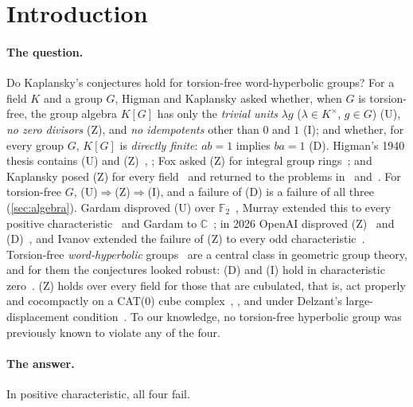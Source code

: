 \documentclass[11pt]{article}
\theoremstyle{definition}
\theoremstyle{plain}
\newcommand{\F}{\mathbb{F}}
\newcommand{\C}{\mathbb{C}}
\begin{document}
\section{Introduction}\label{sec:intro}

\paragraph{The question.} Do Kaplansky's conjectures hold for torsion-free word-hyperbolic groups? For a field $K$ and a group $G$, Higman and Kaplansky asked whether, when $G$ is torsion-free, the group algebra $K[G]$ has only the \emph{trivial units} $\lambda g$ ($\lambda\in K^\times$, $g\in G$) \textup{(U)}, \emph{no zero divisors} \textup{(Z)}, and \emph{no idempotents} other than $0$ and $1$ \textup{(I)}; and whether, for every group $G$, $K[G]$ is \emph{directly finite}: $ab=1$ implies $ba=1$ \textup{(D)}. Higman's 1940 thesis contains (U) and (Z)~\cite[p.~112]{Sandling1981}, \cite{Higman1940thesis,Higman1940}; Fox asked (Z) for integral group rings~\cite[p.~557]{Fox1953}; and Kaplansky posed (Z) for every field~\cite[Problem~6]{Kaplansky1957} and returned to the problems in~\cite{Kaplansky1970} and~\cite[pp.~122--123]{Kaplansky1972}. For torsion-free $G$, (U)$\Rightarrow$(Z)$\Rightarrow$(I), and a failure of (D) is a failure of all three (\cref{sec:algebra}). Gardam disproved (U) over $\F_2$~\cite{Gardam2021}, Murray extended this to every positive characteristic~\cite{Murray2021} and Gardam to $\C$~\cite{Gardam2024}; in 2026 OpenAI disproved (Z)~\cite{OAI196} and (D)~\cite{OAI197b,OAI197d,OAI197a}, and Ivanov extended the failure of (Z) to every odd characteristic~\cite{Ivanov2026}. Torsion-free \emph{word-hyperbolic} groups~\cite{Gromov1987} are a central class in geometric group theory, and for them the conjectures looked robust: (D) and (I) hold in characteristic zero~\cite{Kaplansky1972,Montgomery1969,Puschnigg2002,BLR2008}. (Z) holds over every field for those that are cubulated, that is, act properly and cocompactly on a CAT(0) cube complex~\cite[Thm.~1.1]{Agol2013}, \cite[Thm.~1.3(1)]{FisherSanchezPeralta2026}, and under Delzant's large-displacement condition~\cite{Delzant1997,AvramidiDelzant2023}. To our knowledge, no torsion-free hyperbolic group was previously known to violate any of the four.

\paragraph{The answer.} In positive characteristic, all four fail.
\end{document}
